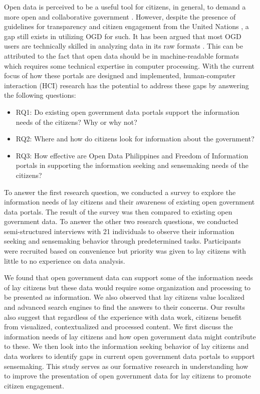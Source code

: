 \documentclass{sigchi}
\begin{document}
Open data is perceived to be a useful tool for citizens, in general, to demand a more open and collaborative government \cite{warwick2017}. However, despite the presence of guidelines for transparency and citizen engagement from the United Nations \cite{UN2013}, a gap still exists in utilizing OGD for such. It has been argued that most OGD users are technically skilled in analyzing data in its raw formats \cite{DAWES201615}. This can be attributed to the fact that open data should be in machine-readable formats which requires some technical expertise in computer processing. With the current focus of how these portals are designed and implemented, human-computer interaction (HCI) research has the potential to address these gaps by answering the following questions:
\begin{itemize}
    \item RQ1: Do existing open government data portals support the information needs of the citizens? Why or why not?
    \item RQ2: Where and how do citizens look for information about the government?
    \item RQ3: How effective are Open Data Philippines and Freedom of Information portals in supporting the information seeking and sensemaking needs of the citizens?
\end{itemize}

To answer the first research question, we conducted a survey to explore the information needs of lay citizens and their awareness of existing open government data portals. The result of the survey was then compared to existing open government data. To answer the other two research questions, we conducted semi-structured interviews with 21 individuals to observe their information seeking and sensemaking behavior through predetermined tasks. Participants were recruited based on convenience but priority was given to lay citizens with little to no experience on data analysis.

We found that open government data can support some of the information needs of lay citizens but these data would require some organization and processing to be presented as information. We also observed that lay citizens value localized and advanced search engines to find the answers to their concerns. Our results also suggest that regardless of the experience with data work, citizens benefit from visualized, contextualized and processed content. We first discuss the information needs of lay citizens and how open government data might contribute to these. We then look into the information seeking behavior of lay citizens and data workers to identify gaps in current open government data portals to support sensemaking. This study serves as our formative research in understanding how to improve the presentation of open government data for lay citizens to promote citizen engagement.
\end{document}
